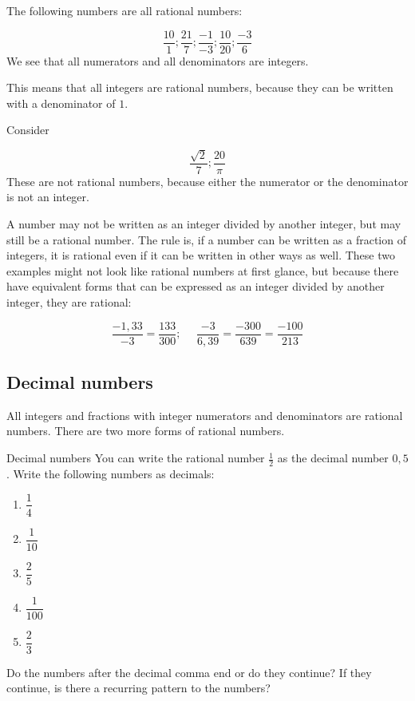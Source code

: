 The following numbers are all rational numbers:\par 


\begin{equation*}
\frac{10}{1};\frac{21}{7};\frac{-1}{-3};\frac{10}{20};\frac{-3}{6}
\end{equation*}
We see that all numerators and all denominators are integers.\par 

\par
This means that all integers are rational numbers, because they can be written with a denominator of $1$.\par 
Consider

\begin{equation*}
\frac{\sqrt{2}}{7} ; \frac{20}{\pi}
\end{equation*}
These are not rational numbers, because either the numerator or the denominator is not an integer.\par 
A number may not be written as an integer divided by another integer, but may still
be a rational number. The rule is, if a number can be written
as a fraction of integers, it is rational even if it can be written in other
ways as well. These two examples might not look like rational numbers
at first glance, but because there have equivalent forms that can be expressed as an
integer divided by another integer, they are rational:\par 
\nopagebreak\noindent{}
\begin{equation*}    
\frac{-1,33}{-3}=\frac{133}{300}; ~~~~~~\frac{-3}{6,39}=\frac{-300}{639}=\frac{-100}{213}
\end{equation*}


\subsection*{Decimal numbers}
\nopagebreak
All integers and fractions with integer numerators and denominators are rational numbers. There are two more forms of rational numbers.\par 




\begin{activity}{Decimal numbers }
\nopagebreak
You can write the rational number
$\frac{1}{2}$ as the decimal number $0,5$. Write the following numbers as
decimals:\par 
\begin{enumerate}[itemsep=5pt, label=\textbf{\arabic*}. ] 
\item $\dfrac{1}{4}$
\item $\dfrac{1}{10}$
\item $\dfrac{2}{5}$
\item $\dfrac{1}{100}$
\item $\dfrac{2}{3}$
\end{enumerate}
Do the numbers after the decimal comma end or do they continue? If they continue, is there a recurring pattern to the numbers? \par 
\end{activity}

